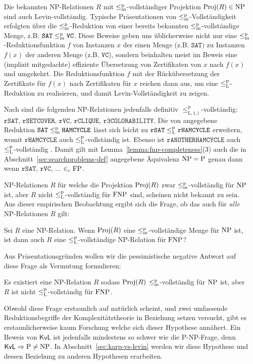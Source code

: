Die bekannten NP-Relationen $R$ mit $\leq_\mathrm{m}^\mathrm{p}$-vollständiger Projektion $\operatorname{Proj}(R)\in\mathrm{NP}$ sind auch Levin-vollständig. Typische Präsentationen von $\leq_\mathrm{m}^\mathrm{p}$-Vollständigkeit erfolgten über die $\leq_\mathrm{m}^\mathrm{p}$-Reduktion von einer bereits bekannten $\leq_\mathrm{m}^\mathrm{p}$-vollständige Menge, z.B. $\mathtt{SAT}\leq_\mathrm{m}^\mathrm{p} \mathtt{VC}$. Diese Beweise geben uns üblicherweise nicht nur eine $\leq_\mathrm{m}^\mathrm{p}$-Reduktionsfunktion $f$ von Instanzen $x$ der einen Menge (z.B. $\mathtt{SAT})$ zu Instanzen $f(x)$ der anderen Menge (z.B. $\mathtt{VC}$), sondern beinhalten meist im Beweis eine (implizit mitgedachte) effiziente Übersetzung von Zertifikaten von $x$ nach $f(x)$ und umgekehrt. Die Reduktionsfunktion $f$ mit der Rückübersetzung der  Zertifikate für $f(x)$ nach Zertifikaten für $x$ reichen dann aus, um eine $\leq_\mathrm{L}^\mathrm{p}$-Reduktion zu realisieren, und damit Levin-Vollständigkeit zu zeigen.

Nach \textcite[104]{goldreich_computational_2008} sind die folgenden NP-Relationen jedenfalls definitiv $\leq_\mathrm{L,1,i}^\mathrm p$-vollständig: $\mathtt{rSAT}$, $\mathtt{rSETCOVER}$, $\mathtt{rVC}$, $\mathtt{rCLIQUE}$, $\mathtt{r3COLORABILITY}$.
Die von \textcite[193-198]{papadimitriou_computational_1994} angegebene Reduktion $\mathtt{SAT}\leq_\mathrm{m}^\mathrm{p}\mathtt{HAMCYCLE}$ lässt sich leicht zu $\mathtt{rSAT}\leq_\mathrm{L}^\mathrm{p}\mathtt{rHAMCYCLE}$ erweitern, womit $\mathtt{rHAMCYCLE}$ auch $\leq_\mathrm{L}^\mathrm{p}$-vollständig ist.
Ebenso ist $\mathtt{rANOTHERHAMCYCLE}$ auch $\leq_\mathrm{L}^\mathrm{p}$-vollständig \parencite*[232]{papadimitriou_computational_1994}. Damit gilt mit Lemma~\ref{lemma:fnp-completeness}(3) auch die in Abschnitt~\ref{sec:searchproblems-def} angegebene Äquivalenz $\mathrm{NP}=\mathrm{P}$ genau dann wenn $\mathtt{rSAT}$, $\mathtt{rVC}$, $\dots$ $\in_\mathrm{c} \mathrm{FP}$.

NP-Relationen $R$ für welche die Projektion $\operatorname{Proj}(R)$ zwar $\leq_\mathrm{m}^\mathrm{p}$-vollständig für $\mathrm{NP}$ ist, aber $R$ nicht $\leq_\mathrm{L}^\mathrm{p}$-vollständig für $\mathrm{FNP}$ sind, scheinen nicht bekannt zu sein.
Aus dieser empirischen Beobachtung ergibt sich die Frage, ob das auch für \emph{alle} NP-Relationen $R$ gilt: 
\begin{question}\label{question:kvl}
Sei $R$ eine NP-Relation. Wenn $\operatorname{Proj}(R)$ eine $\leq_\mathrm{m}^\mathrm{p}$-vollständige Menge für $\mathrm{NP}$ ist, ist dann auch $R$ eine $\leq_\mathrm{L}^\mathrm{p}$-vollständige NP-Relation für $\mathrm{FNP}$?
\end{question}
Aus Präsentationsgründen wollen wir die pessimistische negative Antwort auf diese Frage als Vermutung formulieren:
\begin{conjecture}\label{conj:kvl}
    Es existiert eine NP-Relation $R$ sodass $\operatorname{Proj}(R)$ $\leq_\mathrm{m}^\mathrm{p}$-vollständig für $\mathrm{NP}$ ist, aber $R$ ist nicht $\leq_\mathrm{L}^\mathrm{p}$-vollständig für $\mathrm{FNP}$.
\end{conjecture}
Obwohl diese Frage erstaunlich auf natürlich scheint, und zwei umfassende Reduktionsbegriffe der Komplexitätstheorie in Beziehung setzen versucht, gibt es erstaunlicherweise kaum Forschung welche sich dieser Hypothese annähert.
Ein Beweis von $\mathsf{KvL}$ ist jedenfalls mindestens so schwer wie die P-NP-Frage, denn $\mathsf{KvL}\Rightarrow \mathrm{P}\neq \mathrm{NP}$.
In Abschnitt~\ref{sec:karp-vs-levin} werden wir diese Hypothese und dessen Beziehung zu anderen Hypothesen erarbeiten. %

